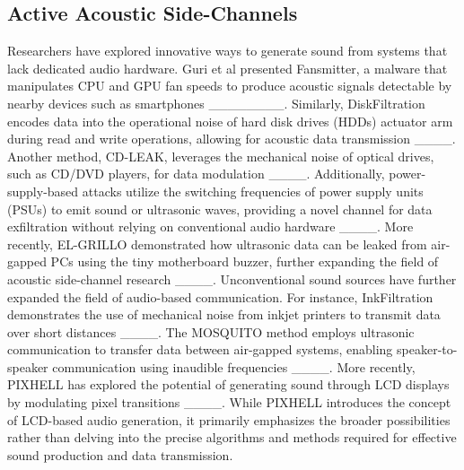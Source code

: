 \subsection{Active Acoustic Side-Channels}
Researchers have explored innovative ways to generate sound from systems that lack dedicated audio hardware. Guri et al presented Fansmitter, a malware that manipulates CPU and GPU fan speeds to produce acoustic signals detectable by nearby devices such as smartphones ________. Similarly, DiskFiltration encodes data into the operational noise of hard disk drives (HDDs) actuator arm during read and write operations, allowing for acoustic data transmission ____. Another method, CD-LEAK, leverages the mechanical noise of optical drives, such as CD/DVD players, for data modulation ____. Additionally, power-supply-based attacks utilize the switching frequencies of power supply units (PSUs) to emit sound or ultrasonic waves, providing a novel channel for data exfiltration without relying on conventional audio hardware ____. More recently, EL-GRILLO demonstrated how ultrasonic data can be leaked from air-gapped PCs using the tiny motherboard buzzer, further expanding the field of acoustic side-channel research ____. 
Unconventional sound sources have further expanded the field of audio-based communication. For instance, InkFiltration demonstrates the use of mechanical noise from inkjet printers to transmit data over short distances ____. The MOSQUITO method employs ultrasonic communication to transfer data between air-gapped systems, enabling speaker-to-speaker communication using inaudible frequencies ____. More recently, PIXHELL has explored the potential of generating sound through LCD displays by modulating pixel transitions ____. While PIXHELL introduces the concept of LCD-based audio generation, it primarily emphasizes the broader possibilities rather than delving into the precise algorithms and methods required for effective sound production and data transmission.

